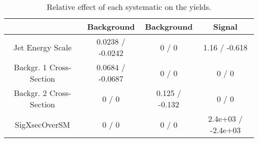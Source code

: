 \documentclass[10pt]{article}
\begin{document}
\begin{table}[htbp]
\begin{center}
\begin{tabular}{|c|c|c|c|}
\hline 
      & Background      & Background      & Signal \\ 
\hline 
  Jet Energy Scale & 0.0238 / -0.0242 & 0 / 0 & 1.16 / -0.618 \\ 
  Backgr. 1 Cross-Section & 0.0684 / -0.0687 & 0 / 0 & 0 / 0 \\ 
  Backgr. 2 Cross-Section & 0 / 0 & 0.125 / -0.132 & 0 / 0 \\ 
 SigXsecOverSM & 0 / 0 & 0 / 0 & 2.4e+03 / -2.4e+03 \\ 
\hline 
\end{tabular} 
\caption{Relative effect of each systematic on the yields.} 
\end{center} 
\end{table} 
\end{document}
